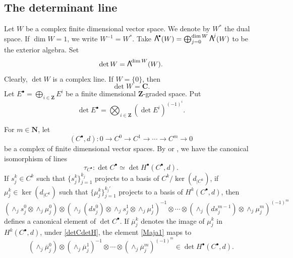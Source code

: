 \documentclass[JEP,XML,SOM,Unicode]{cedram}
\newcommand{\sbullet}{{\scriptscriptstyle\bullet}}
\newcommand\bw[1]{{\hbox{\large$\mathsf{\Lambda}$}^{\!#1}}}
\theoremstyle{plain}
\theoremstyle{definition}
\theoremstyle{remark}
\newcommand{\bN}{\mathbf{N}}
\newcommand{\bZ}{\mathbf{Z}}
\newcommand{\bC}{\mathbf{C}}
\let\ol\overline
\begin{document}
\subsection{The determinant line}\label{sDL}
Let $W$ be a complex finite dimensional vector space. We denote by
$W^*$ the dual space. If $\dim W=1$, we write $W^{-1}=W^{*}$. Take
$\bw\sbullet(W)=\bigoplus_{j=0}^{\dim W}\bw{j}(W)$ to be the exterior algebra. Set
\begin{equation*}
\det W =\bw{\dim W} (W).
\end{equation*}
Clearly, $\det W$ is a complex line. If $W=\{0\}$, then
\begin{equation*}
\det
W=\bC.
\end{equation*}
Let $E^{\sbullet}=\bigoplus_{i\in \bZ} E^{i}$ be a finite dimensional $\bZ$-graded
space. Put
\begin{equation*}
\det E^{\sbullet}= \bigotimes_{i\in \bZ} (\det E^{i})^{(-1)^{i}}.
\end{equation*}

For $m\in \bN$, let
\begin{equation*}
(C^{\sbullet},d): 0\to C^{0}\to C^{1}\to\cdots\to C^{m}\to 0
\end{equation*}
be a complex of finite dimensional vector
spaces. By \cite{KM76} or
\cite[(1.5)]{BGS1}, we
have the canonical isomorphism of lines
\begin{equation}\label{detCdetH}
\tau_{C^{\sbullet}}: \det C^{\sbullet}\simeq \det H^{\sbullet}(C^{\sbullet},d).
\end{equation}
If $s_{j}^{k}\in C^{k}$ such that $\{s_{j}^{k}\}_{j=1}^{k_{j}}$ projects to a basis of
$C^{k}/\ker (d_{|C^{k}})$, if $\mu_{j}^{k}\in \ker( d_{|C^{k}})$ such that
$\{\mu_{j}^{k}\}_{j=1}^{k_{j}'}$ projects to a basis of
$H^{k}(C^\sbullet,d)$,
then
\begin{equation}\label{Maja1}
(\wedge_{j} s^{0}_{j}\otimes \wedge_{j}\mu^{0}_{j})\otimes
(\wedge_{j} (ds^{0}_{j})\otimes
\wedge_{j}s^{1}_{j} \otimes \wedge_{j}\mu^{1}_{j})^{-1} \otimes\cdots \otimes(\wedge_{j}
(ds^{m-1}_{j})\otimes \wedge_{j}\mu^{m}_{j})^{(-1)^m}
\end{equation}
defines a canonical element of $\det C^\sbullet$.
If $\ol{\mu}_{j}^{k}$ denotes the image of $\mu_{j}^{k}$ in $H^{k}(C^{\sbullet},d)$, under
\eqref{detCdetH}, the element \eqref{Maja1} maps to
\begin{equation}\label{Maja11}
( \wedge_{j}\ol{\mu}^{0}_{j})\otimes
( \wedge_{j}\ol{\mu}^{1}_{j})^{-1} \otimes\cdots \otimes(
\wedge_{j}\ol{\mu}^{m}_{j})^{(-1)^m}\in \det
H^{\sbullet}(C^{\sbullet},d).
\end{equation}
\end{document}
